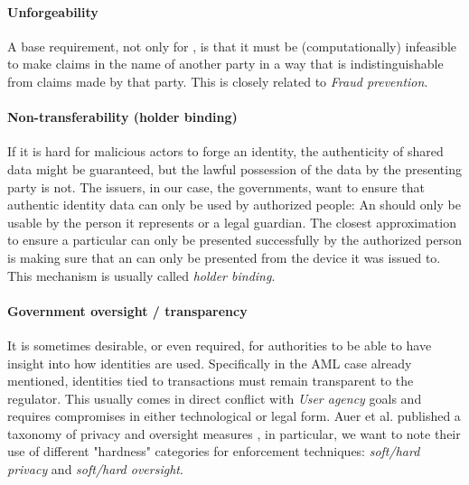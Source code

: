 \paragraph{Unforgeability} A base requirement, not only for \eid, is that it must be (computationally) infeasible to make claims in the name of another party in a way that is indistinguishable from claims made by that party. This is closely related to \emph{Fraud prevention}.

\paragraph{Non-transferability (holder binding)} If it is hard for malicious actors to forge an identity, the authenticity of shared data might be guaranteed, but the lawful possession of the data by the presenting party is not. The issuers, in our case, the governments, want to ensure that authentic identity data can only be used by authorized people: An \eid should only be usable by the person it represents or a legal guardian. The closest approximation to ensure a particular \eid can only be presented successfully by the authorized person is making sure that an \eid can only be presented from the device it was issued to. This mechanism is usually called \emph{holder binding}.

\paragraph{Government oversight / transparency} It is sometimes desirable, or even required, for authorities to be able to have insight into how identities are used. Specifically in the AML case already mentioned, identities tied to transactions must remain transparent to the regulator. This usually comes in direct conflict with \emph{User agency} goals and requires compromises in either technological or legal form. Auer et al. published a taxonomy of privacy and oversight measures \cite{ABCD25}, in particular, we want to note their use of different "hardness" categories for enforcement techniques: \emph{soft/hard privacy} and \emph{soft/hard oversight}.
